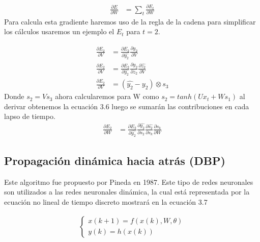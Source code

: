 \begin{equation}
\label{Ts}
\begin{aligned}
	\frac{\partial E}{\partial W}&=\sum_{t}{\frac{\partial E_{t}}{\partial W}}
\end{aligned}
\end{equation}
Para calcula esta gradiente haremos uso de la regla de la cadena para simplificar los cálculos usaremos un ejemplo el $E_{t}$ para $t=2$.


\begin{equation}
\label{Tsfs}
	\begin{aligned}
	\frac{\partial E_{2}}{\partial V}&=\frac{\partial E_{2}}{\partial \hat{y_{2}}} \frac{\partial \hat{y_{2}}}{\partial V}\\
	\frac{\partial E_{2}}{\partial V}&=\frac{\partial E_{2}}{\partial \hat{y_{2}}} \frac{\partial \hat{y_{2}}}{\partial z_{2}} \frac{\partial \hat{z_{2}}}{\partial V}\\
	\frac{\partial E_{2}}{\partial V}&=(\hat{y_{2}}-y_{2})\otimes s_{3}
	\end{aligned}
\end{equation}
Donde $s_{2}=Vs_{3}$ ahora calcularemos para W como $s_{2}=tanh(Ux_{t}+ Ws_{1})$ al derivar obtenemos la ecuación 3.6 luego se sumarán las contribuciones en cada lapso de tiempo.
\begin{equation}
\label{TsSfs}
	\begin{aligned}
		\frac{\partial E_{2}}{\partial W}&=\frac{\partial E_{2}}{\partial \hat{y_{2}}} \frac{\partial \hat{y_{2}}}{\partial s_{2}} \frac{\partial \hat{s_{2}}}{\partial s_{k}} \frac{\partial s_{k}}{\partial W}
	\end{aligned}
\end{equation}


\subsection{Propagación dinámica hacia atrás (DBP)}
Este algoritmo fue propuesto por Pineda\cite{PINEDA} en 1987. Este tipo de redes neuronales son utilizados a las redes neuronales dinámica, la cual está representada por la ecuación no lineal de tiempo discreto mostrará en la ecuación 3.7


\begin{equation}
\label{ECUATION}
\begin{aligned}
\left\lbrace
\begin{array}{ll}
x(k+1)=f(x(k),W,\theta) \\
y(k)= h(x(k))
\end{array}
\right.
\end{aligned}
\end{equation}

